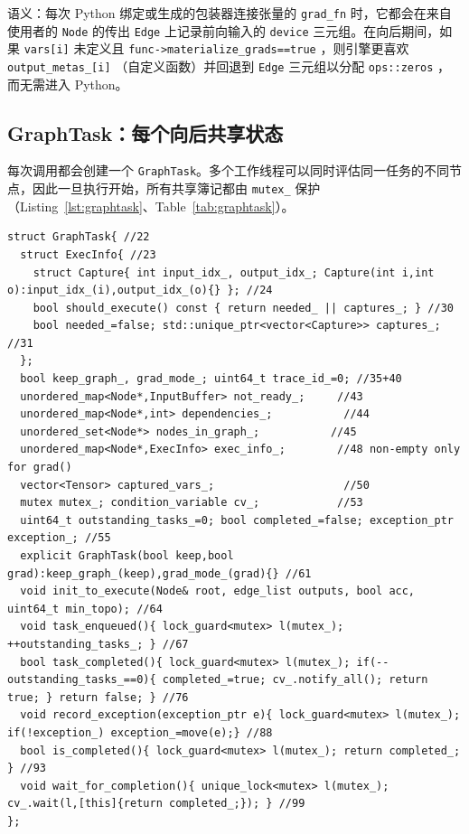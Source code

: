 语义：每次 Python 绑定或生成的包装器连接张量的 \texttt{grad\_fn} 时，它都会在来自使用者的 \texttt{Node} 的传出 \texttt{Edge} 上记录前向输入的 \texttt{device} 三元组。在向后期间，如果 \texttt{vars[i]} 未定义且 \texttt{func->materialize\_grads==true} ，则引擎更喜欢 \texttt{output\_metas\_[i]} （自定义函数）并回退到 \texttt{Edge} 三元组以分配 \texttt{ops::zeros} ，而无需进入 Python。

\subsection{GraphTask：每个向后共享状态}
\label{subsec:graphtask}

每次调用都会创建一个 \texttt{GraphTask}。多个工作线程可以同时评估同一任务的不同节点，因此一旦执行开始，所有共享簿记都由 \texttt{mutex\_} 保护（Listing~\ref{lst:graphtask}、Table~\ref{tab:graphtask}）。

\begin{lstlisting}[caption={per-backward context.}, label=lst:graphtask]
struct GraphTask{ //22
  struct ExecInfo{ //23
    struct Capture{ int input_idx_, output_idx_; Capture(int i,int o):input_idx_(i),output_idx_(o){} }; //24
    bool should_execute() const { return needed_ || captures_; } //30
    bool needed_=false; std::unique_ptr<vector<Capture>> captures_; //31
  };
  bool keep_graph_, grad_mode_; uint64_t trace_id_=0; //35+40
  unordered_map<Node*,InputBuffer> not_ready_;     //43
  unordered_map<Node*,int> dependencies_;           //44
  unordered_set<Node*> nodes_in_graph_;           //45
  unordered_map<Node*,ExecInfo> exec_info_;        //48 non-empty only for grad()
  vector<Tensor> captured_vars_;                    //50
  mutex mutex_; condition_variable cv_;            //53
  uint64_t outstanding_tasks_=0; bool completed_=false; exception_ptr exception_; //55
  explicit GraphTask(bool keep,bool grad):keep_graph_(keep),grad_mode_(grad){} //61
  void init_to_execute(Node& root, edge_list outputs, bool acc, uint64_t min_topo); //64
  void task_enqueued(){ lock_guard<mutex> l(mutex_); ++outstanding_tasks_; } //67
  bool task_completed(){ lock_guard<mutex> l(mutex_); if(--outstanding_tasks_==0){ completed_=true; cv_.notify_all(); return true; } return false; } //76
  void record_exception(exception_ptr e){ lock_guard<mutex> l(mutex_); if(!exception_) exception_=move(e);} //88
  bool is_completed(){ lock_guard<mutex> l(mutex_); return completed_; } //93
  void wait_for_completion(){ unique_lock<mutex> l(mutex_); cv_.wait(l,[this]{return completed_;}); } //99
};
\end{lstlisting}

